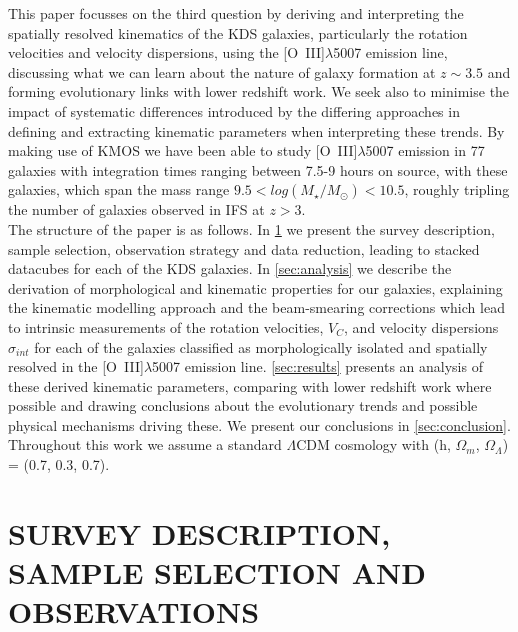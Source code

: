 \documentclass[fleqn,usenatbib]{mn2e}
\begin{document}
This paper focusses on the third question by deriving and interpreting the spatially resolved kinematics of the KDS galaxies, particularly the rotation velocities and velocity dispersions, using the [O~{\sc III}]$\lambda$5007 emission line, discussing what we can learn about the nature of galaxy formation at $z \sim 3.5$ and forming evolutionary links with lower redshift work.
We seek also to minimise the impact of systematic differences introduced by the differing approaches in defining and extracting kinematic parameters when interpreting these trends.  
By making use of KMOS we have been able to study [O~{\sc III}]$\lambda$5007 emission in 77 galaxies with integration times ranging between 7.5-9 hours on source, with these galaxies, which span the mass range $9.5 < log(M_{\star}/M_{\odot}) < 10.5$, roughly tripling the number of galaxies observed in IFS at $z > 3$. \\

The structure of the paper is as follows. In \cref{sec:Survey_and_data} we present the survey description, sample selection, observation strategy and data reduction, leading to stacked datacubes for each of the KDS galaxies.
In \cref{sec:analysis} we describe the derivation of morphological and kinematic properties for our galaxies, explaining the kinematic modelling approach and the beam-smearing corrections which lead to intrinsic measurements of the rotation velocities, $V_{C}$, and velocity dispersions $\sigma_{int}$ for each of the galaxies classified as morphologically isolated and spatially resolved in the [O~{\sc III}]$\lambda$5007 emission line.
\cref{sec:results} presents an analysis of these derived kinematic parameters, comparing with lower redshift work where possible and drawing conclusions about the evolutionary trends and possible physical mechanisms driving these.
We present our conclusions in \cref{sec:conclusion}.
Throughout this work we assume a standard $\Lambda$CDM cosmology with (h, $\Omega_{m}$, $\Omega_{\Lambda}$) = (0.7, 0.3, 0.7). 

\section{SURVEY DESCRIPTION, SAMPLE SELECTION AND OBSERVATIONS}\label{sec:Survey_and_data}
\end{document}
